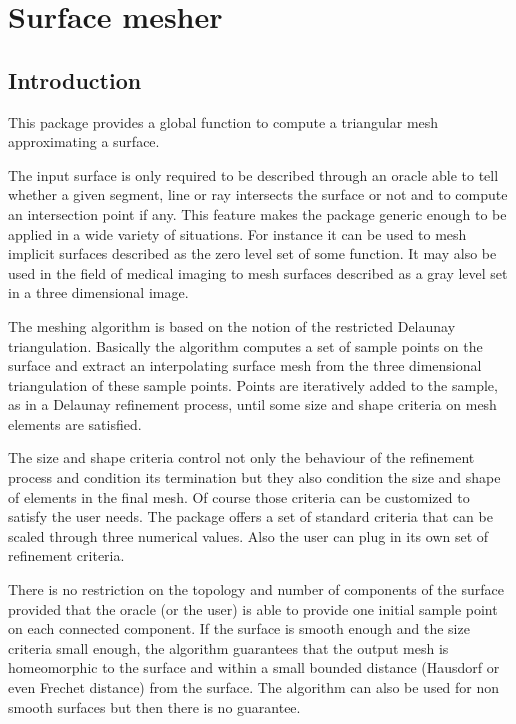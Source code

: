 \chapter{Surface mesher}
\label{chapter_SurfaceMesher}

\vspace*{-15mm}
\minitoc
\vspace*{30mm}

\section{Introduction}
\label{SurfaceMesher_section_intro}

This package provides a global function
to compute a triangular mesh approximating a surface.

The input surface is only required to be described
 through an oracle able to  tell whether a
given segment, line or ray intersects the surface or not
and to compute an intersection point if any.
This feature makes the package generic enough to be
applied in a wide variety of situations. For instance it can be
used to mesh implicit surfaces described as the zero level set
of some function. It may also be used in the field of medical imaging
to mesh surfaces described as a gray
level set in a three dimensional image.


The meshing algorithm is based on the notion of the restricted
Delaunay triangulation. Basically the algorithm  computes a set of
sample points on the surface and extract an interpolating 
surface mesh  from the three dimensional triangulation of these 
sample points. Points are iteratively added to the sample,
as in a Delaunay refinement process, until some size and shape
criteria on mesh elements are satisfied. 


The size and shape criteria control not only the  behaviour of
the refinement process and condition its termination
but they also condition  the size and shape of elements in the final
mesh. Of course those criteria can be customized to satisfy
the user needs. The  package offers
a set of standard criteria that can be scaled through
three numerical values. Also the user can plug in its own 
set of refinement criteria.

There is no restriction on the topology and number of components
of the surface provided that the oracle (or the user)
is able to provide one initial sample point on each connected component.
If the surface is smooth enough and the size criteria
small enough, the algorithm guarantees 
that the output mesh is homeomorphic to the
surface and within a small bounded distance
(Hausdorf or even Frechet distance) from the surface.
The algorithm can also be used for non smooth surfaces
but then there is no guarantee. 




